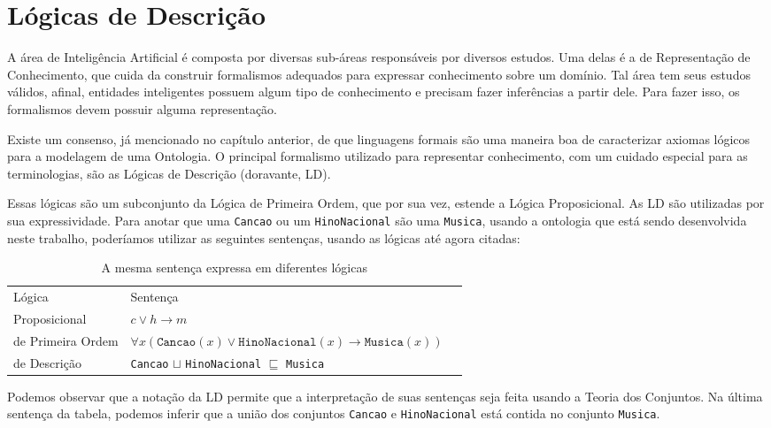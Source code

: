 \chapter{Lógicas de Descrição}

\lettrine{A}{} área de Inteligência Artificial é composta por diversas sub-áreas responsáveis por diversos estudos. Uma delas é a de Representação de Conhecimento, que cuida da construir formalismos adequados para expressar conhecimento sobre um domínio. Tal área tem seus estudos válidos, afinal, entidades inteligentes possuem algum tipo de conhecimento e precisam fazer inferências a partir dele. Para fazer isso, os formalismos devem possuir alguma representação.

Existe um consenso, já mencionado no capítulo anterior, de que linguagens formais são uma maneira boa de caracterizar axiomas lógicos para a modelagem de uma Ontologia. O principal formalismo utilizado para representar conhecimento, com um cuidado especial para as terminologias, são as Lógicas de Descrição (doravante, LD).

Essas lógicas são um subconjunto da Lógica de Primeira Ordem, que por sua vez, estende a Lógica Proposicional. As LD são utilizadas por sua expressividade. Para anotar que uma \texttt{Cancao} ou um \texttt{HinoNacional} são uma \texttt{Musica}, usando a ontologia que está sendo desenvolvida neste trabalho, poderíamos utilizar as seguintes sentenças, usando as lógicas até agora citadas:

\begin{table}[H]
	\centering
	\begin{tabular}{|l|l|l}
		\cline{1-2}
		Lógica                   & Sentença                                                                             & \\ \cline{1-2}
		Proposicional            & $c \lor h \to m$                   & \\ \cline{1-2}
		de Primeira Ordem        & $\forall x(\texttt{Cancao}(x) \lor \texttt{HinoNacional}(x) \to \texttt{Musica}(x))$ & \\ \cline{1-2}
		de Descrição             & \texttt{Cancao} $\sqcup$ \texttt{HinoNacional} $\sqsubseteq$ \texttt{Musica}         & \\ \cline{1-2}
	\end{tabular}
\caption{A mesma sentença expressa em diferentes lógicas}
\end{table}

Podemos observar que a notação da LD permite que a interpretação de suas sentenças seja feita usando a Teoria dos Conjuntos. Na última sentença da tabela, podemos inferir que a união dos conjuntos \texttt{Cancao} e \texttt{HinoNacional} está contida no conjunto \texttt{Musica}.

